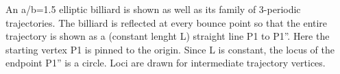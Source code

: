 An a/b=1.5 elliptic billiard is shown as well as its family of 3-periodic trajectories. The billiard is reflected at every bounce point so that the entire trajectory is shown as a (constant lenght L) straight line P1 to P1''. Here the starting vertex P1 is pinned to the origin. Since L is constant, the locus of the endpoint P1'' is a circle. Loci are drawn for intermediate trajectory vertices.